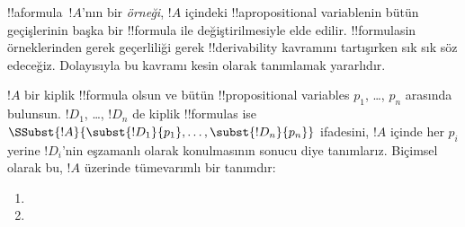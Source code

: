 



!!a{formula}~$!A$'nın bir \emph{örneği}, $!A$ içindeki
!!a{propositional variable}{}nin bütün geçişlerinin başka bir !!{formula} ile
değiştirilmesiyle elde edilir. !!{formula}s{}in örneklerinden gerek geçerliliği
gerek !!{derivability} kavramını tartışırken sık sık söz edeceğiz.
Dolayısıyla bu kavramı kesin olarak tanımlamak yararlıdır.

\begin{defn}
  $!A$ bir kiplik !!{formula} olsun ve bütün !!{propositional variable}s
  $p_1$, \dots, $p_n$ arasında bulunsun. $!D_1$, \dots, $!D_n$ de kiplik
  !!{formula}s ise
  $\SSubst{!A}{\subst{!D_1}{p_1}, \dots, \subst{!D_n}{p_n}}$ ifadesini,
  $!A$ içinde her $p_i$ yerine $!D_i$'nin eşzamanlı olarak konulmasının
  sonucu diye tanımlarız. Biçimsel olarak bu, $!A$ üzerinde tümevarımlı bir
  tanımdır:
  \begin{enumerate}
    \item {}
    \item {}
\end{enumerate}
\end{defn}
